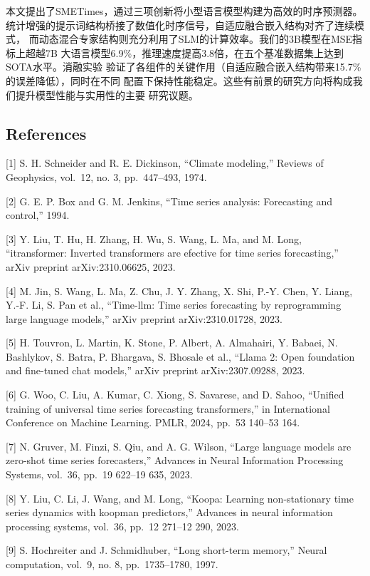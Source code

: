 \documentclass[
  10
]{article}
\begin{document}
本文提出了SMETimes，通过三项创新将小型语言模型构建为高效的时序预测器。
统计增强的提示词结构桥接了数值化时序信号，自适应融合嵌入结构对齐了连续模式，
而动态混合专家结构则充分利用了SLM的计算效率。我们的3B模型在MSE指标上超越7B
大语言模型6.9\%，推理速度提高3.8倍，在五个基准数据集上达到SOTA水平。消融实验
验证了各组件的关键作用（自适应融合嵌入结构带来15.7\%的误差降低），同时在不同
配置下保持性能稳定。这些有前景的研究方向将构成我们提升模型性能与实用性的主要
研究议题。

\subsection{References}\label{references}

{[}1{]} S. H. Schneider and R. E. Dickinson, ``Climate modeling,''
Reviews of Geophysics, vol.~12, no. 3, pp.~447--493, 1974.

{[}2{]} G. E. P. Box and G. M. Jenkins, ``Time series analysis:
Forecasting and control,'' 1994.

{[}3{]} Y. Liu, T. Hu, H. Zhang, H. Wu, S. Wang, L. Ma, and M. Long,
``itransformer: Inverted transformers are efective for time series
forecasting,'' arXiv preprint arXiv:2310.06625, 2023.

{[}4{]} M. Jin, S. Wang, L. Ma, Z. Chu, J. Y. Zhang, X. Shi, P.-Y. Chen,
Y. Liang, Y.-F. Li, S. Pan et al., ``Time-llm: Time series forecasting
by reprogramming large language models,'' arXiv preprint
arXiv:2310.01728, 2023.

{[}5{]} H. Touvron, L. Martin, K. Stone, P. Albert, A. Almahairi, Y.
Babaei, N. Bashlykov, S. Batra, P. Bhargava, S. Bhosale et al., ``Llama
2: Open foundation and fine-tuned chat models,'' arXiv preprint
arXiv:2307.09288, 2023.

{[}6{]} G. Woo, C. Liu, A. Kumar, C. Xiong, S. Savarese, and D. Sahoo,
``Unified training of universal time series forecasting transformers,''
in International Conference on Machine Learning. PMLR, 2024, pp.~53
140--53 164.

{[}7{]} N. Gruver, M. Finzi, S. Qiu, and A. G. Wilson, ``Large language
models are zero-shot time series forecasters,'' Advances in Neural
Information Processing Systems, vol.~36, pp.~19 622--19 635, 2023.

{[}8{]} Y. Liu, C. Li, J. Wang, and M. Long, ``Koopa: Learning
non-stationary time series dynamics with koopman predictors,'' Advances
in neural information processing systems, vol.~36, pp.~12 271--12 290,
2023.

{[}9{]} S. Hochreiter and J. Schmidhuber, ``Long short-term memory,''
Neural computation, vol.~9, no. 8, pp.~1735--1780, 1997.
\end{document}
